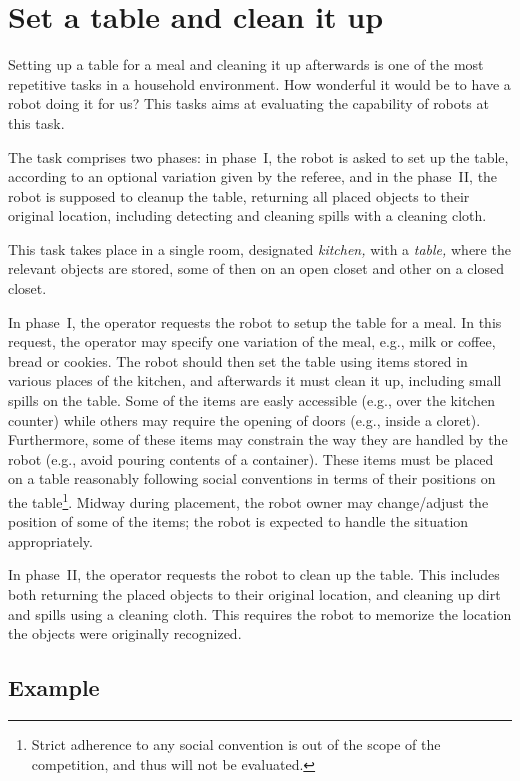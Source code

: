 \section{Set a table and clean it up}

Setting up a table for a meal and cleaning it up afterwards is one of the most repetitive tasks in a household environment. How wonderful it would be to have a robot doing it for us? This tasks aims at evaluating the capability of robots at this task.

The task comprises two phases: in phase~I, the robot is asked to set up the table, according to an optional variation given by the referee, and in the phase~II, the robot is supposed to cleanup the table, returning all placed objects to their original location, including detecting and cleaning spills with a cleaning cloth.

This task takes place in a single room, designated \emph{kitchen,} with a \emph{table,} where the relevant objects are stored, some of then on an open closet and other on a closed closet.

In phase~I, the operator requests the robot to setup the table for a meal. In this request, the operator may specify one variation of the meal, e.g., milk or coffee, bread or cookies. The robot should then set the table using items stored in various places of the kitchen, and afterwards it must clean it up, including small spills on the table. Some of the items are easly accessible (e.g., over the kitchen counter) while others may require the opening of doors (e.g., inside a cloret). Furthermore, some of these items may constrain the way they are handled by the robot (e.g., avoid pouring contents of a container). These items must be placed on a table reasonably following social conventions in terms of their positions on the table\footnote{Strict adherence to any social convention is out of the scope of the competition, and thus will not be evaluated.}. Midway during placement, the robot owner may change/adjust the position of some of the items; the robot is expected to handle the situation appropriately.

In phase~II, the operator requests the robot to clean up the table. This includes both returning the placed objects to their original location, and cleaning up dirt and spills using a cleaning cloth. This requires the robot to memorize the location the objects were originally recognized.


\subsection{Example}

